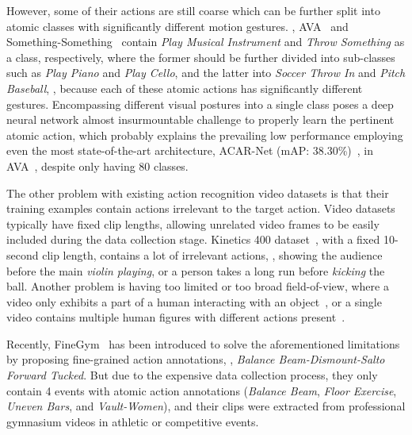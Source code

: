 \documentclass[10pt,twocolumn,letterpaper]{article}
\begin{document}
However, some of their actions are still coarse which can be further split into atomic classes with significantly different motion gestures. \Eg, AVA~\cite{AVA} and Something-Something~\cite{goyal2017something} contain \textit{Play Musical Instrument} and \textit{Throw Something} as a class, respectively, where the former should be further divided into sub-classes such as \textit{Play Piano} and \textit{Play Cello}, and the latter into \textit{Soccer Throw In} and \textit{Pitch Baseball}, \etc, because each of these atomic actions has significantly different gestures. Encompassing different visual postures into a single class poses a deep neural network almost insurmountable challenge to properly learn the pertinent atomic action, which probably explains the prevailing low performance employing even the most state-of-the-art architecture, ACAR-Net (mAP: 38.30\%)~\cite{acarnet}, in AVA~\cite{AVA}, despite only having 80 classes. 

The other problem with existing action recognition video datasets is that their training examples contain actions irrelevant to the target action. 
Video datasets typically have fixed clip lengths, allowing unrelated video frames to be easily included during the data collection stage. Kinetics 400 dataset~\cite{kinetics400}, with a fixed 10-second clip length, contains a lot of irrelevant actions, \eg, showing the audience before the main \textit{violin playing}, or a person takes a long run before \textit{kicking} the ball.
Another problem is having too limited or too broad field-of-view, where a video only exhibits a part of a human interacting with an object~\cite{goyal2017something}, or a single video contains multiple human figures with different actions present~\cite{AVA,kinetics400,zhao2019hacs}.

Recently, FineGym~\cite{finegym} has been introduced to solve the aforementioned limitations by proposing fine-grained action annotations, \eg, \textit{Balance Beam-Dismount-Salto Forward Tucked}. But due to the expensive data collection process, they only contain 4 events with atomic action annotations (\textit{Balance Beam}, \textit{Floor Exercise}, \textit{Uneven Bars}, and \textit{Vault-Women}), and their clips were extracted from professional gymnasium videos in athletic or competitive events.
\end{document}
